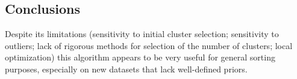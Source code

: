 \documentclass[12pt]{article}
\begin{document}
      

\subsection{Conclusions}
Despite its limitations (sensitivity to initial cluster selection; sensitivity to outliers; lack of rigorous methods for selection of the number of clusters; local optimization) this algorithm appears to be very useful for general sorting purposes, especially on new datasets that lack well-defined priors.


%
%
\end{document}
